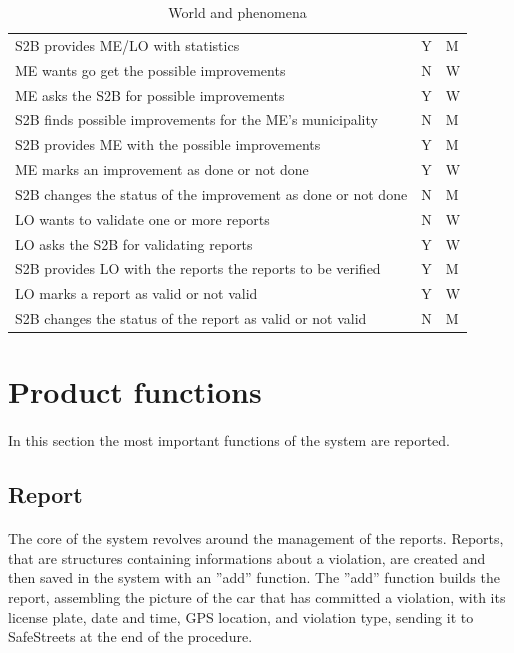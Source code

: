 \begin{table}[!h]
\begin{center}
\begin{tabular}{L{0.73\textwidth}P{0.1\textwidth}P{0.059\textwidth}}
								S2B provides ME/LO with statistics & Y & M \\[1mm]
								ME wants go get the possible improvements & N & W \\[1mm]
								ME asks the S2B for possible improvements & Y & W \\[1mm]
								S2B finds possible improvements for the ME's municipality & N & M \\[1mm]
								S2B provides ME with the possible improvements & Y & M \\[1mm]
								ME marks an improvement as done or not done & Y & W \\[1mm]
								S2B changes the status of the improvement as done or not done & N & M \\[1mm]
								LO wants to validate one or more reports & N & W \\[1mm]
								LO asks the S2B for validating reports & Y & W \\[1mm]
								S2B provides LO with the reports the reports to be verified & Y & M \\[1mm]
								LO marks a report as valid or not valid & Y & W \\[1mm]
								S2B changes the status of the report as valid or not valid & N & M \\[1mm]
							\bottomrule
						\end{tabular}
					\end{center}
					\caption{World and phenomena}
				\end{table}
		\clearpage
		\section{Product functions}
			\paragraph{}
				In this section the most important functions of the system are reported.
			\subsection{Report}
				\paragraph{}
					The core of the system revolves around the management of the reports. Reports, that are structures containing informations about a violation, are created and then saved in the system with an ''add'' function. The ''add'' function builds the report, assembling the picture of the car that has committed a violation, with its license plate, date and time, GPS location, and violation type, sending it to SafeStreets at the end of the procedure. 
					
